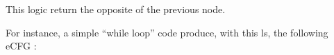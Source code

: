 This logic return the opposite of the previous node.

For instance, a simple ``while loop'' code produce, with this \gls{ls}, the following eCFG :
